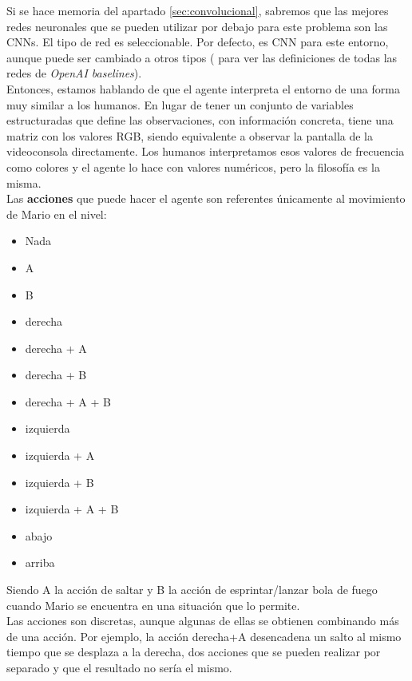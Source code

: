 \documentclass[11pt,fleqn]{book} %
\begin{document}
Si se hace memoria del apartado \ref{sec:convolucional}, sabremos que las mejores redes neuronales que se pueden utilizar por debajo para este problema son las CNNs. El tipo de red es seleccionable. Por defecto, es CNN para este entorno, aunque puede ser cambiado a otros tipos (\cite{article:redesbaselines} para ver las definiciones de todas las redes de \textit{OpenAI baselines}). \\

Entonces, estamos hablando de que el agente interpreta el entorno de una forma muy similar a los humanos. En lugar de tener un conjunto de variables estructuradas que define las observaciones, con información concreta, tiene una matriz con los valores RGB, siendo equivalente a observar la pantalla de la videoconsola directamente. Los humanos interpretamos esos valores de frecuencia como colores y el agente lo hace con valores numéricos, pero la filosofía es la misma. \\

Las \textbf{acciones} que puede hacer el agente son referentes únicamente al movimiento de Mario en el nivel:\\

\begin{itemize}
	\item Nada
	\item A
	\item B
	\item derecha
	\item derecha + A
	\item derecha + B
	\item derecha + A + B
	\item izquierda
	\item izquierda + A
	\item izquierda + B
	\item izquierda + A + B
	\item abajo
	\item arriba\\
\end{itemize}

Siendo A la acción de saltar y B la acción de esprintar/lanzar bola de fuego cuando Mario se encuentra en una situación que lo permite.\\

Las acciones son discretas, aunque algunas de ellas se obtienen combinando más de una acción. Por ejemplo, la acción derecha+A desencadena un salto al mismo tiempo que se desplaza a la derecha, dos acciones que se pueden realizar por separado y que el resultado no sería el mismo. \\
\end{document}
